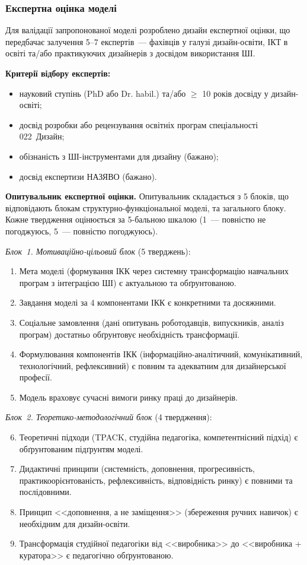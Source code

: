\subsubsection{Експертна оцінка моделі}\label{sssec:3.3.6}

Для валідації запропонованої моделі розроблено дизайн експертної оцінки, що передбачає залучення 5--7 експертів~--- фахівців у галузі дизайн-освіти, ІКТ в освіті та/або практикуючих дизайнерів з досвідом використання ШІ.

\textbf{Критерії відбору експертів:}
\begin{itemize}
    \item науковий ступінь (PhD або Dr. habil.) та/або $\geq$ 10 років досвіду у дизайн-освіті;
    \item досвід розробки або рецензування освітніх програм спеціальності 022~Дизайн;
    \item обізнаність з ШІ-інструментами для дизайну (бажано);
    \item досвід експертизи НАЗЯВО (бажано).
\end{itemize}

\textbf{Опитувальник експертної оцінки.} Опитувальник складається з 5 блоків, що відповідають блокам структурно-функціональної моделі, та загального блоку. Кожне твердження оцінюється за 5-бальною шкалою (1~--- повністю не погоджуюсь, 5~--- повністю погоджуюсь).

\textit{Блок~1. Мотиваційно-цільовий блок} (5 тверджень):
\begin{enumerate}
    \item Мета моделі (формування ІКК через системну трансформацію навчальних програм з інтеграцією ШІ) є актуальною та обґрунтованою.
    \item Завдання моделі за 4 компонентами ІКК є конкретними та досяжними.
    \item Соціальне замовлення (дані опитувань роботодавців, випускників, аналіз програм) достатньо обґрунтовує необхідність трансформації.
    \item Формулювання компонентів ІКК (інформаційно-аналітичний, комунікативний, технологічний, рефлексивний) є повним та адекватним для дизайнерської професії.
    \item Модель враховує сучасні вимоги ринку праці до дизайнерів.
\end{enumerate}

\textit{Блок~2. Теоретико-методологічний блок} (4 твердження):
\begin{enumerate}
    \setcounter{enumi}{5}
    \item Теоретичні підходи (TPACK, студійна педагогіка, компетентнісний підхід) є обґрунтованим підґрунтям моделі.
    \item Дидактичні принципи (системність, доповнення, прогресивність, практикоорієнтованість, рефлексивність, відповідність ринку) є повними та послідовними.
    \item Принцип <<доповнення, а не заміщення>> (збереження ручних навичок) є необхідним для дизайн-освіти.
    \item Трансформація студійної педагогіки від <<виробника>> до <<виробника + куратора>> є педагогічно обґрунтованою.
\end{enumerate}

